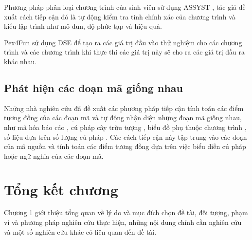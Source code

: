 Phương pháp phân loại chương trình của sinh viên sử dụng ASSYST
\cite{jackson1997grading}, tác giả đề xuất cách tiếp cận đó là tự động
kiểm tra tính chính xác của chương trình và kiểu lập trình như mô đun,
độ phức tạp và hiệu quả.
	
Pex4Fun sử dụng DSE để tạo ra các giá trị đầu vào thử nghiệm cho các
chương trình và các chương trình khi thực thi các giá trị này sẽ cho
ra các giá trị đầu ra khác nhau.
	
\subsection*{Phát hiện các đoạn mã giống nhau}

Những nhà nghiên cứu đã đề xuất các phương pháp tiếp cận tính toán các
điểm tương đồng của các đoạn mã và tự động nhận diện những đoạn mã
giống nhau, như mã hóa báo cáo \cite{kamiya2002ccfinder}, cú pháp cây
trừu tượng \cite{baxter1998clone}, biểu đồ phụ thuộc chương trình
\cite{komondoor2001using}, số liệu dựa trên số lượng cú pháp
\cite{dang2012xiao} \cite{merlo2004linear}. Các cách tiếp cận này tập
trung vào các đoạn của mã nguồn và tính toán các điểm tương đồng dựa
trên việc biểu diễn cú pháp hoặc ngữ nghĩa của các đoạn mã.
	
\section*{Tổng kết chương}
Chương 1 giới thiệu tổng quan về lý do và mục đích chọn đề tài, đối
tượng, phạm vi và phương pháp nghiên cứu thực hiện, những nội dung
chính cần nghiên cứu và một số nghiên cứu khác có liên quan đến đề
tài.




